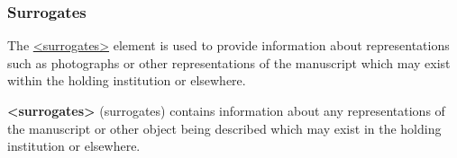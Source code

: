 \subsubsection[{Surrogates}]{Surrogates}\label{msadsu}\par
The \hyperref[TEI.surrogates]{<surrogates>} element is used to provide information about representations such as photographs or other representations of the manuscript which may exist within the holding institution or elsewhere. 
\begin{sansreflist}
  
\item [\textbf{<surrogates>}] (surrogates) contains information about any representations of the manuscript or other object being described which may exist in the holding institution or elsewhere.
\end{sansreflist}
\par

